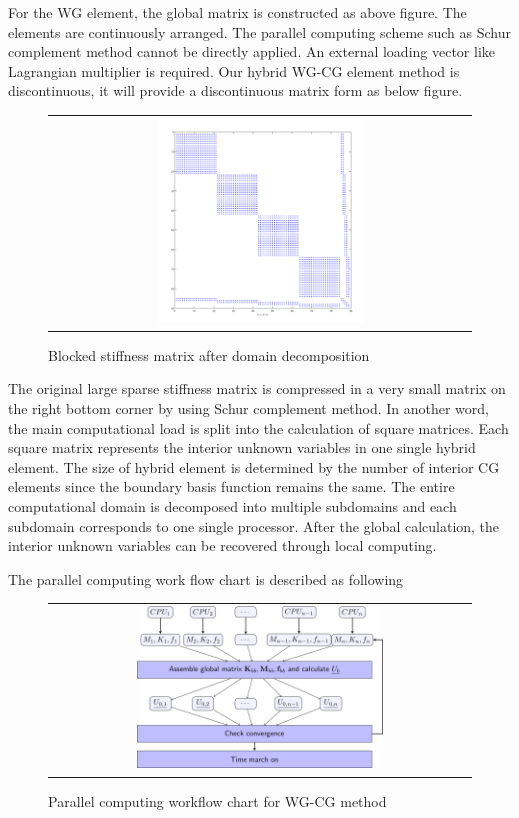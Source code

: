  For the WG element, the global matrix is constructed as above figure. The elements are continuously arranged. The parallel computing scheme such as Schur complement method cannot be directly applied. An external loading vector like Lagrangian multiplier is required. Our hybrid WG-CG element method is discontinuous, it will provide a discontinuous matrix form as below figure. 
 
  \begin{figure}[H]
  	\centering
  	\begin{tabular}{c}
  		\includegraphics[width=0.5\textwidth]{./pics/hmatrix1.png}
  	\end{tabular}
  	\caption{\footnotesize Blocked stiffness matrix after domain decomposition}
  \end{figure}
  
  The original large sparse stiffness matrix is compressed in a very small matrix on the right bottom corner by using Schur complement method. In another word, the main computational load is split into the calculation of square matrices. Each square matrix represents the interior unknown variables in one single hybrid element. The size of hybrid element is determined by the number of interior CG elements since the boundary basis function remains the same. The entire computational domain is decomposed into multiple subdomains and each subdomain corresponds to one single processor. After the global calculation, the interior unknown variables can be recovered through local computing.
  
  The parallel computing work flow chart is described as following
  
    \begin{figure}[h]
    	\centering
    	\begin{tabular}{c}
    		\includegraphics[width=0.6\textwidth]{./pics/flowchart1.png}
    	\end{tabular}
    	\caption{\footnotesize Parallel computing workflow chart for WG-CG method}
    \end{figure}
    

